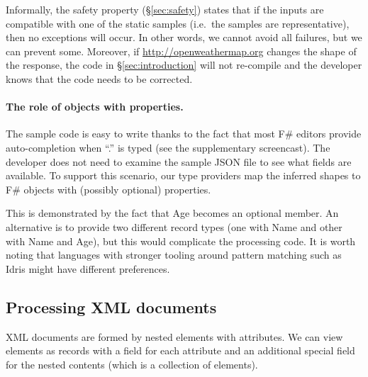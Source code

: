 \documentclass[10pt]{sigplanconf}
\newcommand{\ident}[1]{\textnormal{\sffamily #1}}
\begin{document}
Informally, the safety property (\S\ref{sec:safety}) states that if the inputs are compatible
with one of the static samples (i.e.~the samples are representative), then no exceptions will 
occur. In other words, we cannot avoid all failures, but we can prevent some. Moreover, if
\url{http://openweathermap.org} changes the shape of the response, the code in \S\ref{sec:introduction}
will not re-compile and the developer knows that the code needs to be corrected. 

\paragraph{The role of objects with properties.}
The sample code is easy to write thanks to the fact that most F\# editors provide auto-completion
when ``.'' is typed (see the supplementary screencast). The developer does not need to examine the 
sample JSON file to see what fields are available. To support this scenario, our type providers 
map the inferred shapes to F\# objects with (possibly optional) properties.

This is demonstrated by the fact that \ident{Age} becomes an optional member.
An alternative is to provide two different record types (one with \ident{Name} and other with 
\ident{Name} and \ident{Age}), but this would complicate the processing code.
It is worth noting that languages with stronger tooling around pattern matching
such as Idris \cite{idris-tools} might have different preferences.


\subsection{Processing XML documents}
\label{sec:providers-xml}

XML documents are formed by nested elements with attributes. We can view elements as records with 
a field for each attribute and an additional special field for the nested contents (which is a 
collection of elements).
\end{document}

